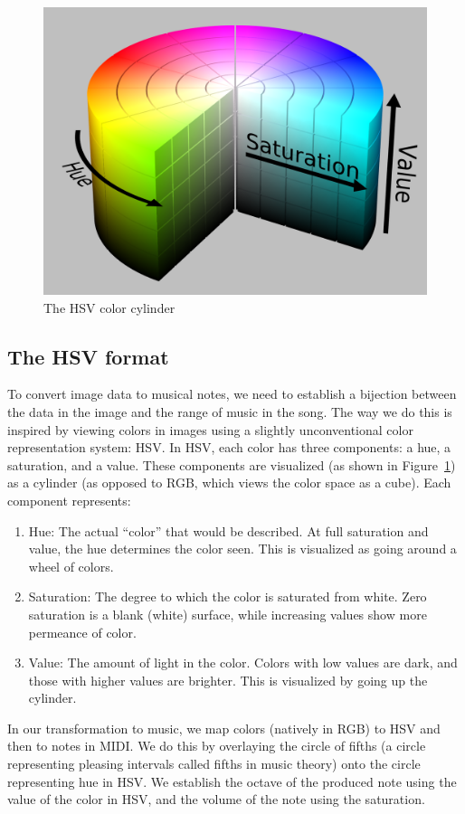 \documentclass[10pt, conference, compsocconf]{IEEEtran}
\begin{document}
\begin{figure}
  \centering
  \includegraphics[width=.4\textwidth]{hsv.png}
  \caption{The HSV color cylinder}
  \label{fig:hsv}
\end{figure}

\subsection{The HSV format}

To convert image data to musical notes, we need to establish a
bijection between the data in the image and the range of music in the
song.  The way we do this is inspired by viewing colors in images
using a slightly unconventional color representation system: HSV.  In
HSV, each color has three components: a hue, a saturation, and a
value.  These components are visualized (as shown in
Figure~\ref{fig:hsv}) as a cylinder (as opposed to RGB, which views
the color space as a cube).  Each component represents:

\begin{enumerate}
\item Hue: The actual ``color'' that would be described.  At full
  saturation and value, the hue determines the color seen.  This is
  visualized as going around a wheel of colors.

\item Saturation: The degree to which the color is saturated from
  white.  Zero saturation is a blank (white) surface, while increasing
  values show more permeance of color.

\item Value: The amount of light in the color.  Colors with low values
  are dark, and those with higher values are brighter.  This is
  visualized by going up the cylinder.
\end{enumerate}

In our transformation to music, we map colors (natively in RGB) to HSV
and then to notes in MIDI.  We do this by overlaying the circle of
fifths (a circle representing pleasing intervals called fifths in
music theory) onto the circle representing hue in HSV.  We establish
the octave of the produced note using the value of the color in HSV,
and the volume of the note using the saturation.
\end{document}
